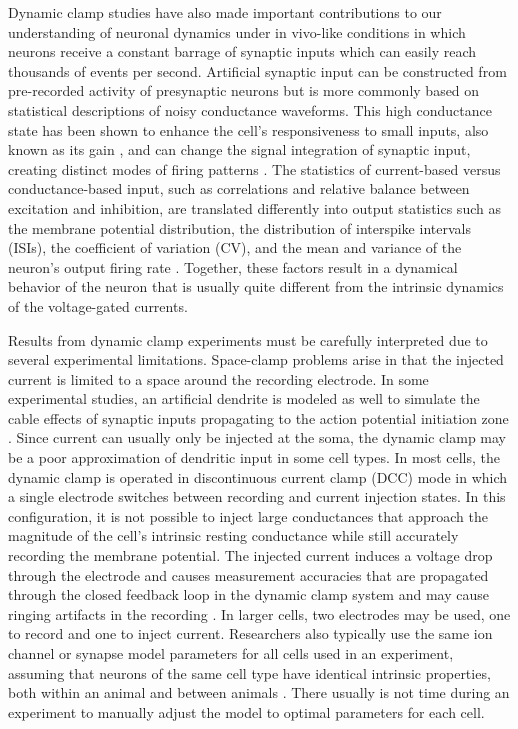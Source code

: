 Dynamic clamp studies have also made important contributions to our understanding of neuronal dynamics under in vivo-like conditions in which neurons receive a constant barrage of synaptic inputs which can easily reach thousands of events per second. Artificial synaptic input can be constructed from pre-recorded activity of presynaptic neurons but is more commonly based on statistical descriptions of noisy conductance waveforms. This high conductance state has been shown to enhance the cell's responsiveness to small inputs, also known as its gain \cite{Chance:2002p1075,Destexhe:2003p1021,Sceniak:2010p1258}, and can change the signal integration of synaptic input, creating distinct modes of firing patterns \cite{Wolfart:2005p1138,Steriade:2001p4667,Rudolph:2003p4555,Destexhe:2001p1044}. The statistics of current-based versus conductance-based input, such as correlations and relative balance between excitation and inhibition, are translated differently into output statistics such as the membrane potential distribution, the distribution of interspike intervals (ISIs), the coefficient of variation (CV), and the mean and variance of the neuron's output firing rate \cite{Tiesinga:2000p1134,Rudolph:2003p4554,Kumar:2008p4586,Salinas:2000p4826}. Together, these factors result in a dynamical behavior of the neuron that is usually quite different from the intrinsic dynamics of the voltage-gated currents. 

Results from dynamic clamp experiments must be carefully interpreted due to several experimental limitations. Space-clamp problems arise in that the injected current is limited to a space around the recording electrode. In some experimental studies, an artificial dendrite is modeled as well to simulate the cable effects of synaptic inputs propagating to the action potential initiation zone \cite{Hughes:2008p993}. Since current can usually only be injected at the soma, the dynamic clamp may be a poor approximation of dendritic input in some cell types. In most cells, the dynamic clamp is operated in discontinuous current clamp (DCC) mode in which a single electrode switches between recording and current injection states. In this configuration, it is not possible to inject large conductances that approach the magnitude of the cell's intrinsic resting conductance while still accurately recording the membrane potential. The injected current induces a voltage drop through the electrode and causes measurement accuracies that are propagated through the closed feedback loop in the dynamic clamp system and may cause ringing artifacts in the recording \cite{Brizzi:2004p935,Jaeger:1999p1094,Preyer:2007p359,Preyer:2009p1228}. In larger cells, two electrodes may be used, one to record and one to inject current. Researchers also typically use the same ion channel or synapse model parameters for all cells used in an experiment, assuming that neurons of the same cell type have identical intrinsic properties, both within an animal and between animals \cite{Golowasch:2002p5763}. There usually is not time during an experiment to manually adjust the model to optimal parameters for each cell.


